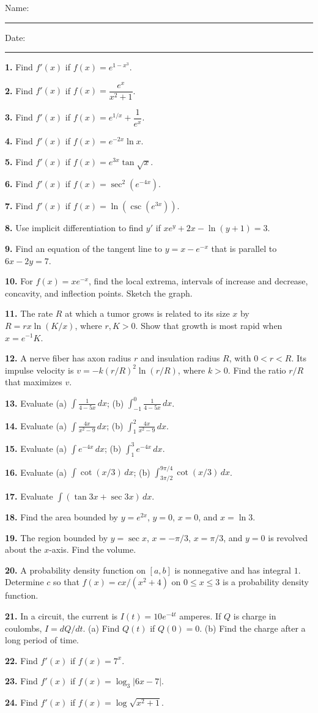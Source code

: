 \documentclass[11pt]{article}
\newcommand{\wsL}{\vspace*{6.5cm}}
\newcommand{\prob}[1]{\par\noindent\textbf{#1.}\quad}
\begin{document}
Name: \rule{2.8in}{.4pt}\hfill Date: \rule{1.2in}{.4pt}\par\medskip
\prob{1} Find $f'(x)$ if $f(x)=e^{1-x^3}$.
\wsL
\vfill
\prob{2} Find $f'(x)$ if $f(x)=\dfrac{e^x}{x^2+1}$.
\wsL
\clearpage
\prob{3} Find $f'(x)$ if $f(x)=e^{1/x}+\dfrac1{e^x}$.
\wsL
\vfill
\prob{4} Find $f'(x)$ if $f(x)=e^{-2x}\ln x$.
\wsL
\clearpage
\prob{5} Find $f'(x)$ if $f(x)=e^{3x}\tan\sqrt{x}$.
\wsL
\vfill
\prob{6} Find $f'(x)$ if $f(x)=\sec^2(e^{-4x})$.
\wsL
\clearpage
\prob{7} Find $f'(x)$ if $f(x)=\ln(\csc(e^{3x}))$.
\wsL
\vfill
\prob{8} Use implicit differentiation to find $y\prime$ if $xe^y+2x-\ln(y+1)=3$.
\wsL
\clearpage
\prob{9} Find an equation of the tangent line to $y=x-e^{-x}$ that is parallel to $6x-2y=7$.
\wsL
\vfill
\prob{10} For $f(x)=xe^{-x}$, find the local extrema, intervals of increase and decrease, concavity, and inflection points. Sketch the graph.
\wsL
\clearpage
\prob{11} The rate $R$ at which a tumor grows is related to its size $x$ by $R=rx\ln(K/x)$, where $r,K>0$. Show that growth is most rapid when $x=e^{-1}K$.
\wsL
\vfill
\prob{12} A nerve fiber has axon radius $r$ and insulation radius $R$, with $0<r<R$. Its impulse velocity is $v=-k(r/R)^2\ln(r/R)$, where $k>0$. Find the ratio $r/R$ that maximizes $v$.
\wsL
\clearpage
\prob{13} Evaluate (a) $\displaystyle\int \frac1{4-5x}\,dx$; (b) $\displaystyle\int_{-1}^{0} \frac1{4-5x}\,dx$.
\wsL
\vfill
\prob{14} Evaluate (a) $\displaystyle\int \frac{4x}{x^2-9}\,dx$; (b) $\displaystyle\int_{1}^{2} \frac{4x}{x^2-9}\,dx$.
\wsL
\clearpage
\prob{15} Evaluate (a) $\displaystyle\int e^{-4x}\,dx$; (b) $\displaystyle\int_{1}^{3} e^{-4x}\,dx$.
\wsL
\vfill
\prob{16} Evaluate (a) $\displaystyle\int\cot(x/3)\,dx$; (b) $\displaystyle\int_{3\pi/2}^{9\pi/4}\cot(x/3)\,dx$.
\wsL
\clearpage
\prob{17} Evaluate $\displaystyle\int(\tan3x+\sec3x)\,dx$.
\wsL
\vfill
\prob{18} Find the area bounded by $y=e^{2x}$, $y=0$, $x=0$, and $x=\ln3$.
\wsL
\clearpage
\prob{19} The region bounded by $y=\sec x$, $x=-\pi/3$, $x=\pi/3$, and $y=0$ is revolved about the $x$-axis. Find the volume.
\wsL
\vfill
\prob{20} A probability density function on $[a,b]$ is nonnegative and has integral $1$. Determine $c$ so that $f(x)=cx/(x^2+4)$ on $0\leq x\leq3$ is a probability density function.
\wsL
\clearpage
\prob{21} In a circuit, the current is $I(t)=10e^{-4t}$ amperes. If $Q$ is charge in coulombs, $I=dQ/dt$. (a) Find $Q(t)$ if $Q(0)=0$. (b) Find the charge after a long period of time.
\wsL
\vfill
\prob{22} Find $f'(x)$ if $f(x)=7^x$.
\wsL
\clearpage
\prob{23} Find $f'(x)$ if $f(x)=\log_3|6x-7|$.
\wsL
\vfill
\prob{24} Find $f'(x)$ if $f(x)=\log\sqrt{x^2+1}$.
\end{document}
